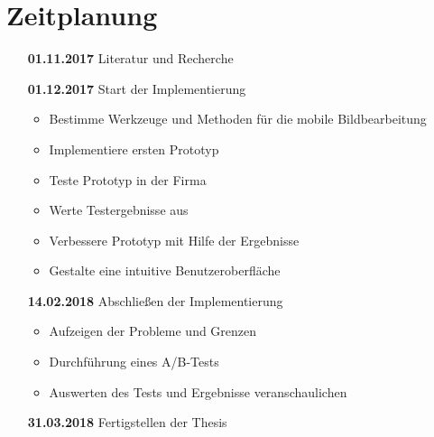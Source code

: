 \documentclass[a4paper]{article}
\begin{document}
\section*{Zeitplanung}
\begin{itemize}
	\item[\textbf{01.11.2017}] Literatur und Recherche
	\item[\textbf{01.12.2017}] Start der Implementierung
		\begin{itemize}
			\item Bestimme Werkzeuge und Methoden für die mobile Bildbearbeitung
			\item Implementiere ersten Prototyp
			\item Teste Prototyp in der Firma
			\item Werte Testergebnisse aus
			\item Verbessere Prototyp mit Hilfe der Ergebnisse
			\item Gestalte eine intuitive Benutzeroberfläche 
		\end{itemize}
	\item[\textbf{14.02.2018}] Abschließen der Implementierung
		\begin{itemize}
			\item Aufzeigen der Probleme und Grenzen
			\item Durchführung eines A/B-Tests
			\item Auswerten des Tests und Ergebnisse veranschaulichen
		\end{itemize}
	\item[\textbf{31.03.2018}] Fertigstellen der Thesis
\end{itemize}
\end{document}
